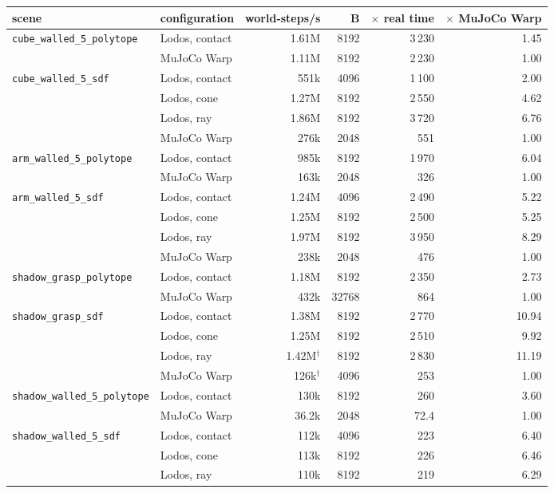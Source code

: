 \begin{longtable}{@{}llrrrr@{}}
\toprule
scene & configuration & world-steps/s & B & $\times$ real time & $\times$ MuJoCo Warp \\
\midrule
\endhead
\texttt{cube\_walled\_5\_polytope} & Lodos, contact & 1.61M & 8192 & 3\,230 & 1.45 \\*
 & MuJoCo Warp & 1.11M & 8192 & 2\,230 & 1.00 \\
\addlinespace
\texttt{cube\_walled\_5\_sdf} & Lodos, contact & 551k & 4096 & 1\,100 & 2.00 \\*
 & Lodos, cone & 1.27M & 8192 & 2\,550 & 4.62 \\*
 & Lodos, ray & 1.86M & 8192 & 3\,720 & 6.76 \\*
 & MuJoCo Warp & 276k & 2048 & 551 & 1.00 \\
\addlinespace
\texttt{arm\_walled\_5\_polytope} & Lodos, contact & 985k & 8192 & 1\,970 & 6.04 \\*
 & MuJoCo Warp & 163k & 2048 & 326 & 1.00 \\
\addlinespace
\texttt{arm\_walled\_5\_sdf} & Lodos, contact & 1.24M & 4096 & 2\,490 & 5.22 \\*
 & Lodos, cone & 1.25M & 8192 & 2\,500 & 5.25 \\*
 & Lodos, ray & 1.97M & 8192 & 3\,950 & 8.29 \\*
 & MuJoCo Warp & 238k & 2048 & 476 & 1.00 \\
\addlinespace
\texttt{shadow\_grasp\_polytope} & Lodos, contact & 1.18M & 8192 & 2\,350 & 2.73 \\*
 & MuJoCo Warp & 432k & 32768 & 864 & 1.00 \\
\addlinespace
\texttt{shadow\_grasp\_sdf} & Lodos, contact & 1.38M & 8192 & 2\,770 & 10.94 \\*
 & Lodos, cone & 1.25M & 8192 & 2\,510 & 9.92 \\*
 & Lodos, ray & 1.42M$^\dagger$ & 8192 & 2\,830 & 11.19 \\*
 & MuJoCo Warp & 126k$^\dagger$ & 4096 & 253 & 1.00 \\
\addlinespace
\texttt{shadow\_walled\_5\_polytope} & Lodos, contact & 130k & 8192 & 260 & 3.60 \\*
 & MuJoCo Warp & 36.2k & 2048 & 72.4 & 1.00 \\
\addlinespace
\texttt{shadow\_walled\_5\_sdf} & Lodos, contact & 112k & 4096 & 223 & 6.40 \\*
 & Lodos, cone & 113k & 8192 & 226 & 6.46 \\*
 & Lodos, ray & 110k & 8192 & 219 & 6.29 \\*

\end{longtable}
